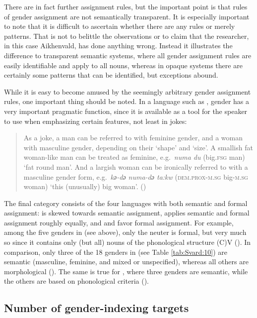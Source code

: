 \documentclass[output=collectionpaper]{langsci/langscibook}
\begin{document}
There are in fact further assignment rules, but the important point is that rules of gender assignment are not semantically transparent. It is especially important to note that it is difficult to ascertain whether there are any rules or merely patterns. That is not to belittle the observations or to claim that the researcher, in this case Aikhenvald, has done anything wrong. Instead it illustrates the difference to transparent semantic systems, where all gender assignment rules are easily identifiable and apply to all nouns, whereas in opaque systems there are certainly some patterns that can be identified, but exceptions abound.

While it is easy to become amused by the seemingly arbitrary gender assignment rules, one important thing should be noted. In a language such as , gender has a very important pragmatic function, since it is available as a tool for the speaker to use when emphasizing certain features, not least in jokes:

\begin{quote}
As a joke, a man can be referred to with feminine gender, and a woman with masculine gender, depending on their `shape' and `size'. A smallish fat woman-like man can be treated as feminine, e.g.\ \textit{numa du} (big.\textsc{fsg} man) `fat round man'. And a largish woman can be ironically referred to with a masculine gender form, e.g.\ \textit{kә-dә numa-dә ta:kw} (\textsc{dem.prox-m.sg} big-\textsc{m.sg} woman) `this (unusually) big woman'. (\citealt[121]{Aikhenvald2008})
\end{quote}

The final category consists of the four languages with both semantic and formal assignment:  is skewed towards semantic assignment,  applies semantic and formal assignment roughly equally, and  and  favor formal assignment. For example, among the five genders in  (see  above), only the neuter is formal, but very much so since it contains only (but all) nouns of the phonological structure (C)V (\citealt{Waelchli2018}). In comparison, only three of the 18 genders in  (see Table \ref{tab:Svard:10}) are semantic (masculine, feminine, and mixed or unspecified), whereas all others are morphological (\citealt[8]{Conrad1991}). The same is true for , where three genders are semantic, while the others are based on phonological criteria (\citealt[119]{Foley1991}).

\subsection{Number of gender-indexing targets}
\label{sec:Svard:3.4}
\end{document}
